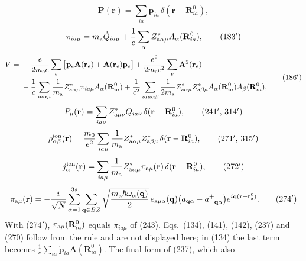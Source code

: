 \documentclass[11pt]{article}
\begin{document}
\begin{equation*}
\mathbf P(\mathbf r)=\sum_{ia}\mathbf p_{ia}\,\delta(\mathbf r-\mathbf R^0_{ia}),\tag{167$'$}
\end{equation*}
\begin{equation*}
\pi_{ia\mu}=m_{\rm a}\dot Q_{ia\mu}+\frac1c\sum_\alpha Z^*_{{\rm a}\alpha\mu}A_\alpha(\mathbf R^0_{ia}),\tag{183$'$}
\end{equation*}
\begin{equation*}
\begin{split}
V={}&-\frac{e}{2m_{\rm e}c}\sum_e\big[\mathbf p_e\mathbf A(\mathbf r_e)+\mathbf A(\mathbf r_e)\mathbf p_e\big]
+\frac{e^2}{2m_{\rm e}c^2}\sum_e\mathbf A^2(\mathbf r_e)\\
&-\frac1c\sum_{ia\alpha\mu}\frac{1}{m_{\rm a}}Z^*_{{\rm a}\alpha\mu}\pi_{ia\mu}A_\alpha(\mathbf R^0_{ia})
+\frac{1}{c^2}\sum_{ia\mu\alpha\beta}\frac{1}{2m_{\rm a}}Z^*_{{\rm a}\alpha\mu}Z^*_{{\rm a}\beta\mu}
A_\alpha(\mathbf R^0_{ia})A_\beta(\mathbf R^0_{ia}),
\end{split}
\tag{186$'$}
\end{equation*}
\begin{equation*}
P_\mu(\mathbf r)=\sum_{ia\nu}Z^*_{{\rm a}\mu\nu}Q_{ia\nu}\,\delta(\mathbf r-\mathbf R^0_{ia}),\tag{241$'$, 314$'$}
\end{equation*}
\begin{equation*}
\rho^{\rm ion}_{\alpha\beta}(\mathbf r)=\frac{m_0}{e^2}\sum_{ia\mu}\frac{1}{m_{\rm a}}Z^*_{{\rm a}\alpha\mu}
Z^*_{{\rm a}\beta\mu}\,\delta(\mathbf r-\mathbf R^0_{ia}),\tag{271$'$, 315$'$}
\end{equation*}
\begin{equation*}
j^{\rm ion}_\alpha(\mathbf r)=\sum_{ia\mu}\frac{1}{m_{\rm a}}Z^*_{{\rm a}\alpha\mu}\pi_{{\rm a}\mu}(\mathbf r)\,
\delta(\mathbf r-\mathbf R^0_{ia}),\tag{272$'$}
\end{equation*}
\begin{equation*}
\pi_{{\rm a}\mu}(\mathbf r)=-\frac{i}{\sqrt N}\sum_{\alpha=1}^{3s}\sum_{\mathbf q\in BZ}
\sqrt{\frac{m_{\rm a}\hbar\omega_\alpha(\mathbf q)}{2}}\,e_{{\rm a}\mu\alpha}(\mathbf q)
\big(a_{\mathbf q\alpha}-a^+_{-\mathbf q\alpha}\big)e^{i\mathbf q(\mathbf r-\mathbf r^0_{\rm a})}.\tag{274$'$}
\end{equation*}
With (274$'$), $\pi_{{\rm a}\mu}(\mathbf R^0_{ia})$ equals $\pi_{ia\mu}$ of (243). Eqs.~(134), (141), (142),
(237) and (270) follow from the rule and are not displayed here; in (134) the last term becomes
$\frac1c\sum_{ia}\dot{\mathbf p}_{ia}\mathbf A(\mathbf R^0_{ia})$. The final form of (237), which also
\end{document}
